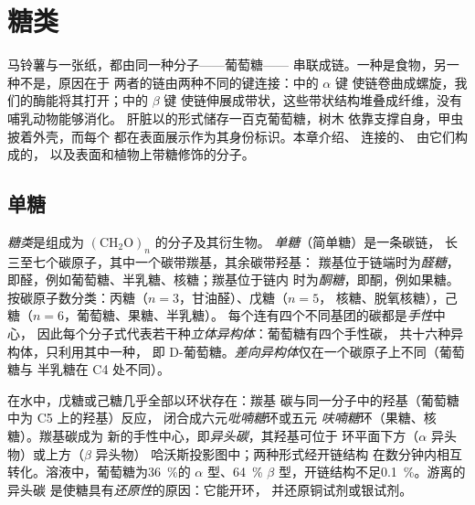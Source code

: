 \chapter{糖类}\label{ch:b1:carbohydrates}

马铃薯与一张纸，都由同一种分子——葡萄糖——
串联成链。一种是食物，另一种不是，原因在于
两者的链由两种不同的键连接：中的 $\alpha$ 键
使链卷曲成螺旋，我们的酶能将其打开；中的 $\beta$ 键
使链伸展成带状，这些带状结构堆叠成纤维，没有哺乳动物能够消化。
肝脏以的形式储存一百克葡萄糖，树木
依靠支撑自身，甲虫披着外壳，而每个
都在表面展示作为其身份标识。本章介绍、
连接的、
由它们构成的，
以及表面和植物上带糖修饰的分子。

\section{单糖}

\begin{definition}[单糖]\label{def:b1:carbohydrates:monosaccharide}
\emph{糖类}是组成为
$(\mathrm{CH_2O})_n$ 的分子及其衍生物。
\emph{单糖}（简单糖）是一条碳链，
长三至七个碳原子，其中一个碳带羰基，其余碳带羟基：
羰基位于链端时为\emph{醛糖}，
即醛，例如葡萄糖、半乳糖、核糖；羰基位于链内
时为\emph{酮糖}，即酮，例如果糖。
按碳原子数分类：丙糖（$n = 3$，甘油醛）、戊糖（$n = 5$，
核糖、脱氧核糖），己糖（$n = 6$，葡萄糖、果糖、半乳糖）。
每个连有四个不同基团的碳都是\emph{手性}中心，
因此每个分子式代表若干种\emph{立体异构体}：葡萄糖有四个手性碳，
共十六种异构体，只利用其中一种，
即 D-葡萄糖。\emph{差向异构体}仅在一个碳原子上不同（葡萄糖与
半乳糖在 C4 处不同）。
\end{definition}

\begin{proposition}[环式结构与异头物]\label{prop:b1:carbohydrates:rings}
在水中，戊糖或己糖几乎全部以环状存在：羰基
碳与同一分子中的羟基（葡萄糖中为 C5 上的羟基）反应，
闭合成六元\emph{吡喃糖}环或五元
\emph{呋喃糖}环（果糖、核糖）。羰基碳成为
新的手性中心，即\emph{异头碳}，其羟基可位于
环平面下方（$\alpha$ 异头物）或上方（$\beta$ 异头物）
哈沃斯投影图中；两种形式经开链结构
在数分钟内相互转化。溶液中，葡萄糖为\qty{36}{\%}的 $\alpha$ 型、\qty{64}{\%}
$\beta$ 型，开链结构不足\qty{0.1}{\%}。游离的异头碳
是使糖具有\emph{还原性}的原因：它能开环，
并还原铜试剂或银试剂。
\end{proposition}

